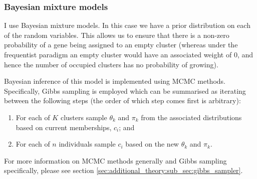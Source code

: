 \documentclass[12pt]{article} %
\begin{document}

	
	\subsubsection{Bayesian mixture models}
	I use Bayesian mixture models. In this case we have a prior distribution on each of the random variables. This allows us to ensure that there is a non-zero probability of a gene being assigned to an empty cluster (whereas under the frequentist paradigm an empty cluster would have an associated weight of 0, and hence the number of occupied clusters has no probability of growing). 
	
	Bayesian inference of this model is implemented using MCMC methods. Specifically, Gibbs sampling is employed which can be summarised as iterating between the following steps (the order of which step comes first is arbitrary):
	\begin{enumerate}
		\item For each of $K$ clusters sample $\theta_k$ and $\pi_k$ from the associated distributions based on current memberships, $c_i$; and
		\item For each of $n$ individuals sample $c_i$ based on the new $\theta_k$ and $\pi_k$.
	\end{enumerate}
	For more information on MCMC methods generally and Gibbs sampling specifically, please see section \ref{sec:additional_theory:sub_sec:gibbs_sampler}.
	
\end{document}
